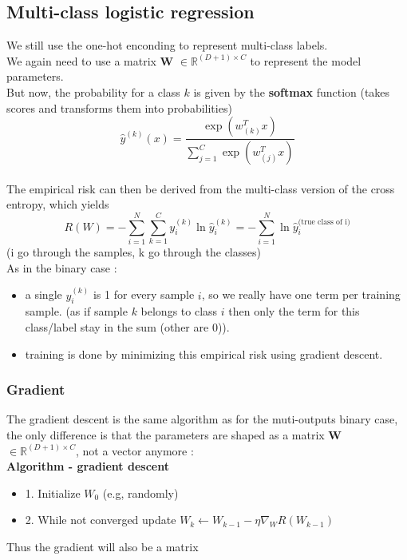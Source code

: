 \subsection{Multi-class logistic regression}
We still use the one-hot enconding to represent multi-class labels. \\
We again need to use a matrix \textbf{W} $\in \mathbb{R}^{\left(D+1\right)\times C}$ to represent the model parameters. \\
But now, the probability for a class $k$ is given by the \textbf{softmax} function (takes scores and transforms them into probabilities) \[
    \hat{y}^{\left(k\right)}(x) = \frac{\exp(w_{\left(k\right)}^Tx)}{\sum_{j=1}^{C}\exp(w_{\left(j\right)}^Tx)}
  \]
\\
The empirical risk can then be derived from the multi-class version of the cross entropy, which yields \[
  R(W) = - \sum_{i=1}^{N}\sum_{k=1}^{C}y_i^{\left(k\right)}\ln \hat{y}_i^{\left(k\right)} = - \sum_{i=1}^{N}\ln\hat{y}_i^{\text{(true class of i)}}
\](i \leftarrow  go through the samples, k \leftarrow  go through the classes) 
\\
As in the binary case :
\begin{itemize}
  \item a single $y_i^{\left(k\right)}$ is 1 for every sample $i$, so we really have one term per training sample. (as if sample $k$ belongs to class $i$ then only the term for this class/label stay in the sum (other are 0)).
  \item training is done by minimizing this empirical risk using gradient descent.
\end{itemize}
\subsubsection{Gradient}

The gradient descent is the same algorithm as for the muti-outputs binary case, the only difference is that the parameters are shaped as a matrix \textbf{W} $\in \mathbb{R}^{\left(D+1\right) \times C}$, not a vector anymore :\\
\textbf{Algorithm - gradient descent}
\begin{itemize}
  \item 1. Initialize $W_0$ (e.g, randomly)
  \item 2. While not converged \implies  update $ W_k \leftarrow W_{k-1} - \eta \nabla_W R(W_{k-1})$
\end{itemize}
Thus the gradient will also be a matrix 


